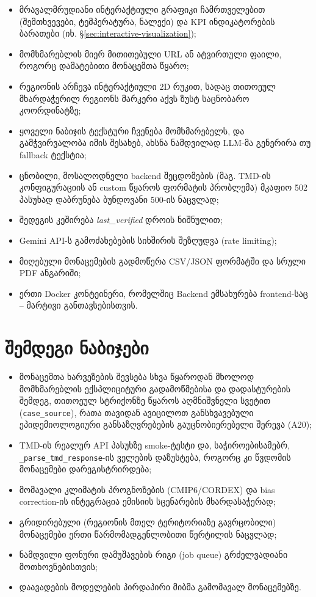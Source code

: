 \documentclass[11pt,a4paper]{article}
\begin{document}
\begin{itemize}[leftmargin=1.4em]
    და გამჭვირვალე Audit Log ინტერაქტიული მოდალური ფანჯრით (იხ. \S\ref{sec:data-harmonization});
  \item მრავალმრუდიანი ინტერაქტიული გრაფიკი ჩამრთველებით (შემთხვევები,
    ტემპერატურა, ნალექი) და KPI ინდიკატორების ბარათები (იხ. \S\ref{sec:interactive-visualization});
  \item მომხმარებლის მიერ მითითებული URL ან ატვირთული ფაილი, როგორც
    დამატებითი მონაცემთა წყარო;
  \item რეგიონის არჩევა ინტერაქტიული 2D რუკით, სადაც თითოეულ
    მხარდაჭერილ რეგიონს მარკერი აქვს ზუსტ საცნობარო კოორდინატზე;
  \item ყოველი ნაბიჯის ტექსტური ჩვენება მომხმარებელს, და გამჭვირვალობა
    იმის შესახებ, ახსნა ნამდვილად LLM-მა გენერირა თუ fallback ტექსტია;
  \item ცნობილი, მოსალოდნელი backend შეცდომების (მაგ. TMD-ის
    კონფიგურაციის ან custom წყაროს ფორმატის პრობლემა) მკაფიო 502
    პასუხად დაბრუნება ბუნდოვანი 500-ის ნაცვლად;
  \item შედეგის კეშირება \emph{last\_verified} დროის ნიშნულით;
  \item Gemini API-ს გამოძახებების სიხშირის შეზღუდვა (rate limiting);
  \item მიღებული მონაცემების გადმოწერა CSV/JSON ფორმატში და სრული PDF ანგარიში;
  \item ერთი Docker კონტეინერი, რომელშიც Backend ემსახურება
    frontend-საც -- მარტივი განთავსებისთვის.
\end{itemize}

\section{შემდეგი ნაბიჯები}

\begin{itemize}[leftmargin=1.4em]
  \item მონაცემთა ხარვეზების შევსება სხვა წყაროდან მხოლოდ მომხმარებლის ექსპლიციტური გადამოწმებისა და დადასტურების შემდეგ, თითოეულ სტრიქონზე წყაროს აღმნიშვნელი სვეტით (\texttt{case\_source}), რათა თავიდან ავიცილოთ განსხვავებული ეპიდემიოლოგიური განსაზღვრებების გაუცნობიერებელი შერევა (A20);
  \item TMD-ის რეალურ API პასუხზე smoke-ტესტი და, საჭიროებისამებრ,
    \texttt{\_parse\_tmd\_response}-ის ველების დაზუსტება, როგორც კი
    წვდომის მონაცემები დარეგისტრირდება;
  \item მომავალი კლიმატის პროგნოზების (CMIP6/CORDEX) და bias correction-ის
    ინტეგრაცია ემისიის სცენარების მხარდასაჭერად;
  \item გრიდირებული (რეგიონის მთელ ტერიტორიაზე გავრცობილი) მონაცემები
    ერთი წარმომადგენლობითი წერტილის ნაცვლად;
  \item ნამდვილი ფონური დამუშავების რიგი (job queue) გრძელვადიანი
    მოთხოვნებისთვის;
  \item დაავადების მოდელების პირდაპირი მიბმა გამომავალ მონაცემებზე.
\end{itemize}
\end{document}

